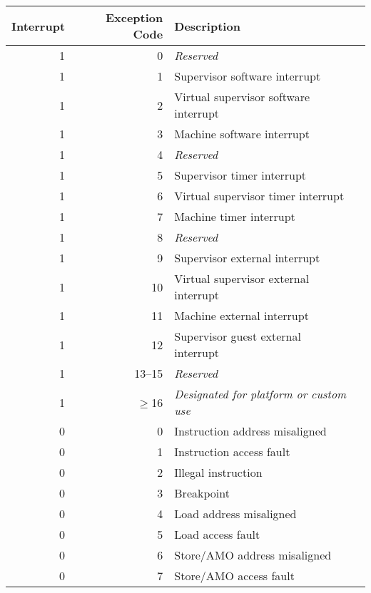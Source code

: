 \begin{table*}[p]
\begin{center}
\begin{tabular}{|r|r|l|l|}
  \hline
  Interrupt & Exception Code  & Description \\
  \hline
  1         & 0               & {\em Reserved} \\
  1         & 1               & Supervisor software interrupt \\
  1         & 2               & Virtual supervisor software interrupt \\
  1         & 3               & Machine software interrupt \\ \hline
  1         & 4               & {\em Reserved} \\
  1         & 5               & Supervisor timer interrupt \\
  1         & 6               & Virtual supervisor timer interrupt \\
  1         & 7               & Machine timer interrupt \\ \hline
  1         & 8               & {\em Reserved} \\
  1         & 9               & Supervisor external interrupt \\
  1         & 10              & Virtual supervisor external interrupt \\
  1         & 11              & Machine external interrupt \\ \hline
  1         & 12              & Supervisor guest external interrupt \\
  1         & 13--15          & {\em Reserved} \\
  1         & $\ge$16         & {\em Designated for platform or custom use} \\ \hline
  0         & 0               & Instruction address misaligned \\
  0         & 1               & Instruction access fault \\
  0         & 2               & Illegal instruction \\
  0         & 3               & Breakpoint \\
  0         & 4               & Load address misaligned \\
  0         & 5               & Load access fault \\
  0         & 6               & Store/AMO address misaligned \\
  0         & 7               & Store/AMO access fault \\

\end{tabular}
\end{center}
\end{table*}

